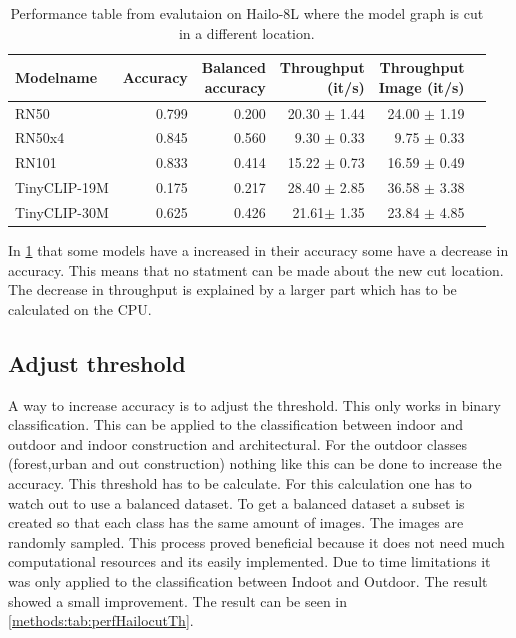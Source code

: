 \begin{table}[h!]
    \centering
    \begin{tabular}{l|rrrrr}
        \hline
        Modelname & Accuracy &  \makecell{Balanced \\accuracy}&\makecell{Throughput\\(it/s)} & \makecell{Throughput \\ Image (it/s)} & \\ \hline
        RN50 & 0.799 & 0.200 & 20.30 $\pm$ 1.44 & 24.00 $\pm$ 1.19  \\ 
        RN50x4 & 0.845 & 0.560 & 9.30  $\pm$ 0.33 & 9.75  $\pm$ 0.33\\
        RN101 & 0.833& 0.414 & 15.22 $\pm$ 0.73 & 16.59 $\pm$ 0.49\\  
        TinyCLIP-19M & 0.175 & 0.217 & 28.40 $\pm$ 2.85 & 36.58 $\pm$ 3.38 \\ 
        TinyCLIP-30M & 0.625 & 0.426 & 21.61$\pm$ 1.35 & 23.84 $\pm$ 4.85\\ 
    \end{tabular}
    \caption{Performance table from evalutaion on Hailo-8L where the model graph is cut in a different location.}
    \label{methods:tab:perfHailocut}
\end{table}

In \cref{methods:tab:perfHailocut} that some models have a increased  in their accuracy some have a decrease in accuracy.
This means that no statment can be made about the new cut location.
The decrease in throughput is explained by a larger part which has to be calculated on the CPU.

\subsection{Adjust threshold}

A way to increase accuracy is to adjust the threshold.
This only works in binary classification.
This can be applied to the classification between indoor and outdoor and indoor construction and architectural.
For the outdoor classes (forest,urban and out construction) nothing like this can be done to increase the accuracy.
This threshold has to be calculate.
For this calculation one has to watch out to use a balanced dataset.
To get a balanced dataset a subset is created so that each class has the same amount of images.
The images are randomly sampled.
This process proved beneficial because it does not need much computational resources and its easily implemented.
Due to time limitations it was only applied to the classification between Indoot and Outdoor.
The result showed a small improvement.
The result can be seen in \cref{methods:tab:perfHailocutTh}.

